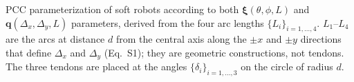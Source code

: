 \caption{PCC parameterization of soft robots according to both $\boldsymbol{\xi}(\theta, \phi, L)$ and $\mathbf{q}(\Delta_x, \Delta_y, L)$ parameters, derived from the four arc lengths $\{L_i\}_{i=1,\dots,4}$. $L_1$--$L_4$ are the arcs at distance $d$ from the central axis along the $\pm x$ and $\pm y$ directions that define $\Delta_x$ and $\Delta_y$ (Eq.~S1); they are geometric constructions, not tendons. The three tendons are placed at the angles $\{\delta_i\}_{i=1,\dots,3}$ on the circle of radius $d$.}
